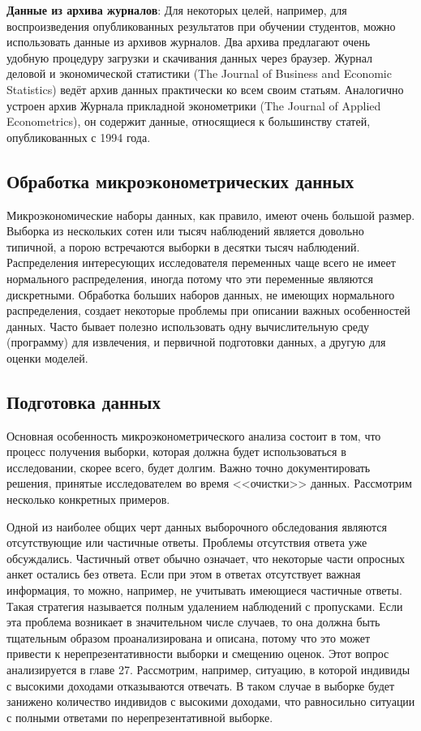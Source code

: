 {\bf Данные из архива журналов}: Для некоторых целей, например, для воспроизведения  опубликованных результатов при обучении студентов, можно  использовать данные из архивов журналов. Два архива предлагают очень удобную процедуру загрузки и скачивания данных через браузер. Журнал деловой и экономической статистики (The Journal of Business and Economic Statistics) ведёт архив данных практически ко всем своим статьям.  Аналогично устроен архив Журнала прикладной эконометрики (The Journal of Applied Econometrics), он содержит данные, относящиеся к большинству статей, опубликованных с 1994 года.



\subsection{Обработка микроэконометрических данных}


Микроэкономические наборы данных, как правило, имеют очень большой размер. Выборка из нескольких сотен или тысяч наблюдений является довольно типичной, а порою встречаются выборки в десятки тысяч наблюдений. Распределения интересующих исследователя переменных чаще всего не имеет нормального распределения, иногда потому что эти переменные являются дискретными. Обработка больших наборов данных, не имеющих нормального распределения,  создает некоторые проблемы при описании важных особенностей данных. Часто бывает полезно использовать одну вычислительную среду (программу) для извлечения, и первичной подготовки данных, а другую для  оценки моделей. 


\subsection{Подготовка данных}

Основная особенность микроэконометрического анализа состоит в том, что процесс получения выборки, которая должна будет использоваться в исследовании, скорее всего, будет долгим. Важно точно документировать решения, принятые исследователем во время <<очистки>> данных. Рассмотрим несколько конкретных примеров.

Одной из наиболее общих черт данных выборочного обследования являются отсутствующие или частичные ответы. Проблемы отсутствия ответа уже обсуждались. Частичный ответ обычно означает, что некоторые части опросных анкет остались без ответа. Если при этом в ответах отсутствует важная информация, то можно, например, не учитывать имеющиеся частичные ответы. Такая стратегия называется полным удалением наблюдений с пропусками. Если эта проблема возникает в значительном числе случаев, то она должна быть тщательным образом проанализирована и описана, потому что это может привести к нерепрезентативности выборки и смещению оценок. Этот вопрос анализируется в главе 27. Рассмотрим, например, ситуацию, в которой индивиды с высокими доходами отказываются отвечать. В таком случае в выборке будет занижено количество индивидов с высокими доходами, что равносильно ситуации с полными ответами по нерепрезентативной выборке.





